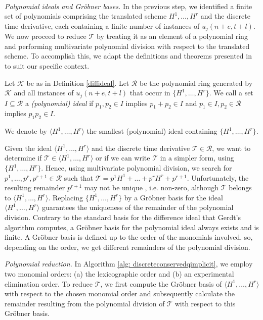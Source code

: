 \documentclass[runningheads]{llncs}
\newcommand{\1}{\chi}
\begin{document}
\\
\emph{Polynomial ideals and Gr{\"o}bner bases.}\label{polid}
In the previous step, we identified a finite set of polynomials comprising the translated scheme ${H^1,\ldots,H^r}$ and the discrete time derivative, each containing a finite number of instances of $u_j(n+e,t+l)$. We now proceed to reduce $\mathcal{T}$ by treating it as an element of a polynomial ring and performing multivariate polynomial division with respect to the translated scheme. To accomplish this, we adapt the definitions and theorems presented in \cite{hibi13} to suit our specific context.
\begin{definition}
	Let $\mathcal{K}$ be as in Definition \ref{diffideal}. Let $\mathcal{R}$ be the polynomial ring generated by $\mathcal{K}$ and all instances of $u_j(n+e,t+l)$ that occur in $\{H^1,\ldots,H^r\}$.
	We call a set $ I\subseteq \mathcal{R}$ a \emph{(polynomial) ideal} if
	$p_1,p_2\in I$ implies $p_1+p_2\in I$ and
	$p_1\in I,p_2\in\mathcal{R}$ implies $p_1p_2\in I$.
\end{definition}
\begin{definition}
	We denote by $\langle H^1,\ldots,H^r\rangle$ the smallest (polynomial) ideal containing $\{H^1,\ldots,H^r\}$.
\end{definition}
Given the ideal $\langle H^1,\ldots,H^r\rangle$ and the discrete time derivative $\mathcal{T}\in\mathcal{R}$, we want to determine if $\mathcal{T}\in\langle H^1,\ldots,H^r\rangle$ or if we can write $\mathcal{T}$ in a simpler form, using $\{H^1,\ldots,H^r\}$.
Hence, using multivariate polynomial division, we search for $p^1,\ldots,p^r,p^{r+1}\in\mathcal{R}$ such that
$
	\mathcal{T}=p^1H^1+\ldots+p^rH^r+p^{r+1}.
$
Unfortunately, the resulting remainder $p^{r+1}$ may not be unique \cite[page 14, Example 1.2.3]{hibi13}, i.e. non-zero, although $\mathcal{T}$ belongs to $\langle H^1,\ldots,H^r \rangle$. 
Replacing $\{H^1,\ldots,H^r\}$ by a Gr{\"o}bner basis for the ideal $\langle H^1,\ldots,H^r \rangle$ guarantees the uniqueness of the remainder of the polynomial division. 
Contrary to the standard basis for the difference ideal that Gerdt's algorithm computes, a Gr{\"o}bner basis for the polynomial ideal always exists and is finite.
A Gr{\"o}bner basis is defined up to the order of the monomials involved, so, depending on the order, we get different remainders of the polynomial division.

\emph{Polynomial reduction.}
In Algorithm \ref{alg: discreteconservedqimplicit}, we employ two monomial orders: (a) the lexicographic order and (b) an experimental elimination order. To reduce $\mathcal{T}$, we first compute the Gr\"obner basis of $\langle H^1,\ldots,H^r\rangle$ with respect to the chosen monomial order and subsequently calculate the remainder resulting from the polynomial division of $\mathcal{T}$ with respect to this Gr\"obner basis.
\end{document}

